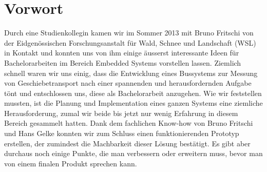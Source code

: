 %
%

\chapter*{Vorwort}\label{chap.vorwort}
Durch eine Studienkollegin kamen wir im Sommer 2013 mit Bruno Fritschi von der Eidgenössischen Forschungsanstalt für Wald, Schnee und Landschaft (WSL) in Kontakt und konnten uns von ihm einige äusserst interessante Ideen für Bachelorarbeiten im Bereich Embedded Systems vorstellen lassen. Ziemlich schnell waren wir uns einig, dass die Entwicklung eines Bussystems zur Messung von Geschiebetransport nach einer spannenden und herausfordernden Aufgabe tönt und entschlossen uns, diese als Bachelorarbeit anzugehen. Wie wir feststellen mussten, ist die Planung und Implementation eines ganzen Systems eine ziemliche Herausforderung, zumal wir beide bis jetzt nur wenig Erfahrung in diesem Bereich gesammelt hatten. Dank dem fachlichen Know-how von Bruno Fritschi und Hans Gelke konnten wir zum Schluss einen funktionierenden Prototyp erstellen, der zumindest die Machbarkeit dieser Lösung bestätigt. Es gibt aber durchaus noch einige Punkte, die man verbessern oder erweitern muss, bevor man von einem finalen Produkt sprechen kann.